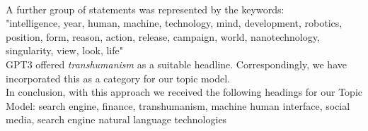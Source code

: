\\
A further group of statements was represented by the keywords:
\\
"intelligence, year, human, machine, technology, mind, development, robotics, position, form, reason, action, release, campaign, world, nanotechnology, singularity, view, look, life"
\\
GPT3 offered \emph{transhumanism} as a suitable headline.
Correspondingly, we have incorporated this as a category for our topic model.
\\
In conclusion, with this approach we received the following headings for our Topic Model: search engine, finance, transhumanism, machine human interface, social media, search engine natural language technologies
